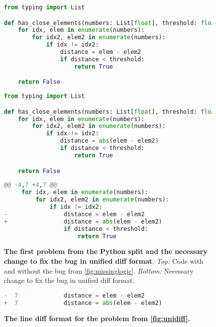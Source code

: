 \begin{figure}[htbp]
\centering
\begin{minipage}{0.48\textwidth}
\begin{lstlisting}[language=Python,breaklines=true,basicstyle=\ttfamily\scriptsize]
from typing import List

def has_close_elements(numbers: List[float], threshold: float) -> bool:
    for idx, elem in enumerate(numbers):
        for idx2, elem2 in enumerate(numbers):
            if idx != idx2:
                distance = elem - elem2
                if distance < threshold:
                    return True

    return False
\end{lstlisting}
\end{minipage}\hfill
\begin{minipage}{0.48\textwidth}
\begin{lstlisting}[language=Python,breaklines=true,basicstyle=\ttfamily\scriptsize]
from typing import List

def has_close_elements(numbers: List[float], threshold: float) -> bool:
    for idx, elem in enumerate(numbers):
        for idx2, elem2 in enumerate(numbers):
            if idx != idx2:
                distance = abs(elem - elem2)
                if distance < threshold:
                    return True

    return False
\end{lstlisting}
\end{minipage}
\begin{minipage}{0.6\textwidth}
\begin{lstlisting}[language=Python,breaklines=true,basicstyle=\ttfamily\scriptsize]
@@ -4,7 +4,7 @@
     for idx, elem in enumerate(numbers):
         for idx2, elem2 in enumerate(numbers):
             if idx != idx2:
-                distance = elem - elem2
+                distance = abs(elem - elem2)
                 if distance < threshold:
                     return True
\end{lstlisting}
\end{minipage}
\caption{\textbf{The first problem from the \evalf{} Python split and the necessary change to fix the bug in unified diff format}. \emph{Top:} Code with and without the bug from \autoref{fig:missinglogic}. \emph{Bottom:} Necessary change to fix the bug in unified diff format.}
\label{fig:unidiff}
\end{figure}

\begin{figure}[htbp]
\centering
\begin{lstlisting}[language=Python,breaklines=true,basicstyle=\ttfamily\scriptsize]
-  7             distance = elem - elem2
+  7             distance = abs(elem - elem2)
\end{lstlisting}
\caption{\textbf{The line diff format for the problem from \autoref{fig:unidiff}.}}
\label{fig:linediff}
\end{figure}


